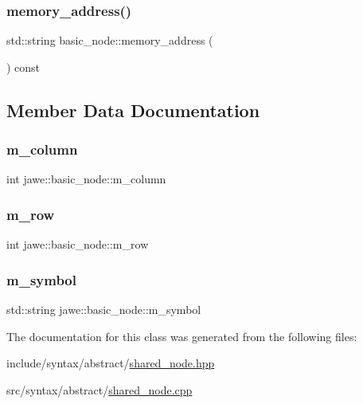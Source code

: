 \subsubsection{\texorpdfstring{memory\+\_\+address()}{memory\_address()}}
{\footnotesize\ttfamily std\+::string basic\+\_\+node\+::memory\+\_\+address (\begin{DoxyParamCaption}{ }\end{DoxyParamCaption}) const}



\subsection{Member Data Documentation}
\mbox{\label{classjawe_1_1basic__node_a219419e1836ea0af56c68aa8e026b0c6}} 
\subsubsection{\texorpdfstring{m\+\_\+column}{m\_column}}
{\footnotesize\ttfamily int jawe\+::basic\+\_\+node\+::m\+\_\+column\hspace{0.3cm}{\ttfamily [private]}}

\mbox{\label{classjawe_1_1basic__node_ace1b7e8628dc9ac0b2562c6e2425d237}} 
\subsubsection{\texorpdfstring{m\+\_\+row}{m\_row}}
{\footnotesize\ttfamily int jawe\+::basic\+\_\+node\+::m\+\_\+row\hspace{0.3cm}{\ttfamily [private]}}

\mbox{\label{classjawe_1_1basic__node_ac6baed9e8bc01d8b953c1c42b8710057}} 
\subsubsection{\texorpdfstring{m\+\_\+symbol}{m\_symbol}}
{\footnotesize\ttfamily std\+::string jawe\+::basic\+\_\+node\+::m\+\_\+symbol\hspace{0.3cm}{\ttfamily [private]}}



The documentation for this class was generated from the following files\+:\begin{DoxyCompactItemize}
\item 
include/syntax/abstract/\hyperlink{shared__node_8hpp}{shared\+\_\+node.\+hpp}\item 
src/syntax/abstract/\hyperlink{shared__node_8cpp}{shared\+\_\+node.\+cpp}\end{DoxyCompactItemize}
